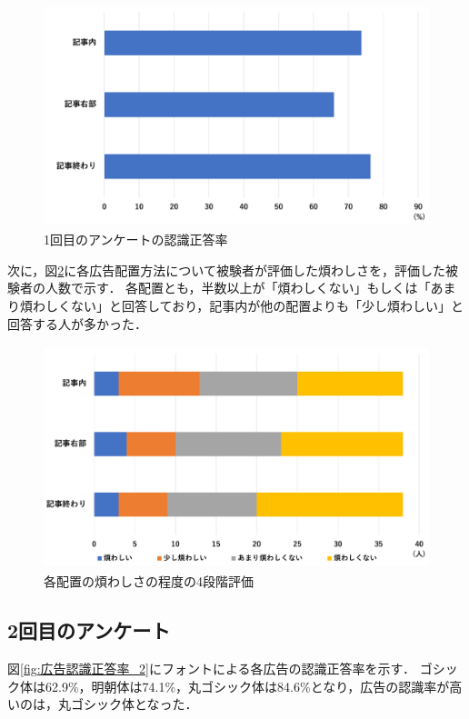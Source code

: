 \documentclass[12pt,a4j,titlepage]{ltjsarticle}
\begin{document}
\begin{figure}[H]
\begin{center}
 \includegraphics[height=65mm]{figures/広告認識正答率_1.pdf}
\end{center}
 \caption{1回目のアンケートの認識正答率}
 \label{fig:広告認識正答率_1}
\end{figure}

次に，図\ref{fig:煩わしさ_1}に各広告配置方法について被験者が評価した煩わしさを，評価した被験者の人数で示す．
各配置とも，半数以上が「煩わしくない」もしくは「あまり煩わしくない」と回答しており，記事内が他の配置よりも「少し煩わしい」と回答する人が多かった．

\begin{figure}[H]
\begin{center}
 \includegraphics[height=65mm]{figures/煩わしさ_1.pdf}
\end{center}
 \caption{各配置の煩わしさの程度の4段階評価}
 \label{fig:煩わしさ_1}
\end{figure}

\subsection{2回目のアンケート}
図\ref{fig:広告認識正答率_2}にフォントによる各広告の認識正答率を示す．
ゴシック体は62.9\%，明朝体は74.1\%，丸ゴシック体は84.6\%となり，広告の認識率が高いのは，丸ゴシック体となった．
\end{document}
